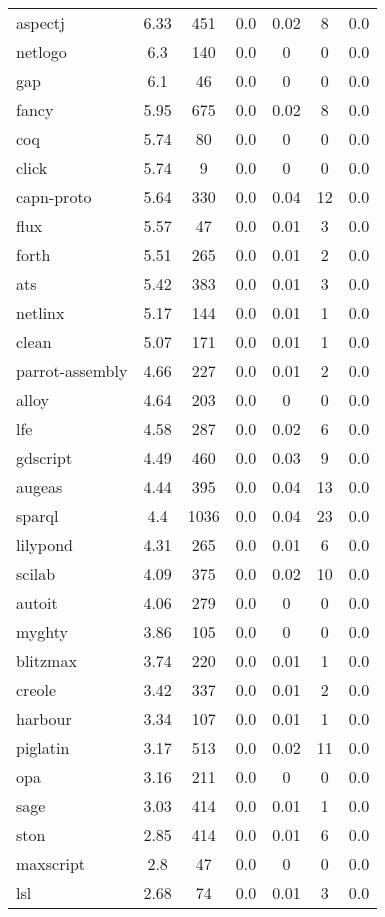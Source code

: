 \begin{longtable}{l|ccc|ccc}
aspectj & 6.33 & 451 & 0.0 & 0.02 & 8 & 0.0 \\
netlogo & 6.3 & 140 & 0.0 & 0 & 0 & 0.0 \\
gap & 6.1 & 46 & 0.0 & 0 & 0 & 0.0 \\
fancy & 5.95 & 675 & 0.0 & 0.02 & 8 & 0.0 \\
coq & 5.74 & 80 & 0.0 & 0 & 0 & 0.0 \\
click & 5.74 & 9 & 0.0 & 0 & 0 & 0.0 \\
capn-proto & 5.64 & 330 & 0.0 & 0.04 & 12 & 0.0 \\
flux & 5.57 & 47 & 0.0 & 0.01 & 3 & 0.0 \\
forth & 5.51 & 265 & 0.0 & 0.01 & 2 & 0.0 \\
ats & 5.42 & 383 & 0.0 & 0.01 & 3 & 0.0 \\
netlinx & 5.17 & 144 & 0.0 & 0.01 & 1 & 0.0 \\
clean & 5.07 & 171 & 0.0 & 0.01 & 1 & 0.0 \\
parrot-assembly & 4.66 & 227 & 0.0 & 0.01 & 2 & 0.0 \\
alloy & 4.64 & 203 & 0.0 & 0 & 0 & 0.0 \\
lfe & 4.58 & 287 & 0.0 & 0.02 & 6 & 0.0 \\
gdscript & 4.49 & 460 & 0.0 & 0.03 & 9 & 0.0 \\
augeas & 4.44 & 395 & 0.0 & 0.04 & 13 & 0.0 \\
sparql & 4.4 & 1036 & 0.0 & 0.04 & 23 & 0.0 \\
lilypond & 4.31 & 265 & 0.0 & 0.01 & 6 & 0.0 \\
scilab & 4.09 & 375 & 0.0 & 0.02 & 10 & 0.0 \\
autoit & 4.06 & 279 & 0.0 & 0 & 0 & 0.0 \\
myghty & 3.86 & 105 & 0.0 & 0 & 0 & 0.0 \\
blitzmax & 3.74 & 220 & 0.0 & 0.01 & 1 & 0.0 \\
creole & 3.42 & 337 & 0.0 & 0.01 & 2 & 0.0 \\
harbour & 3.34 & 107 & 0.0 & 0.01 & 1 & 0.0 \\
piglatin & 3.17 & 513 & 0.0 & 0.02 & 11 & 0.0 \\
opa & 3.16 & 211 & 0.0 & 0 & 0 & 0.0 \\
sage & 3.03 & 414 & 0.0 & 0.01 & 1 & 0.0 \\
ston & 2.85 & 414 & 0.0 & 0.01 & 6 & 0.0 \\
maxscript & 2.8 & 47 & 0.0 & 0 & 0 & 0.0 \\
lsl & 2.68 & 74 & 0.0 & 0.01 & 3 & 0.0 \\

\end{longtable}
